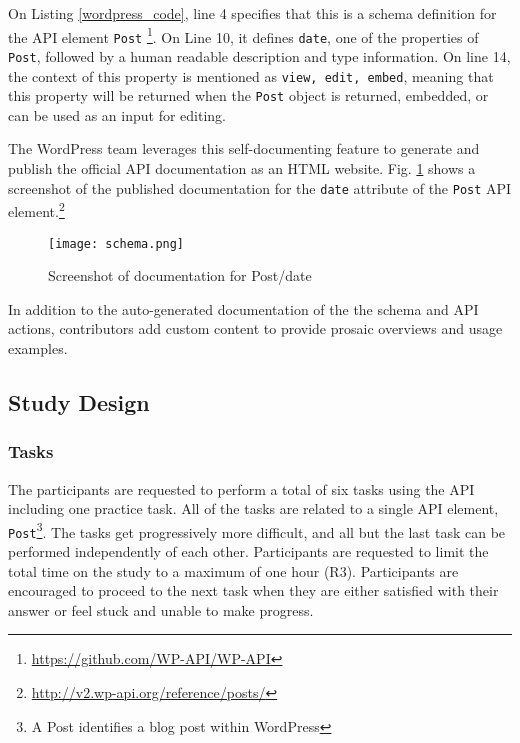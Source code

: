 On Listing \ref{wordpress_code}, line 4 specifies that this is a schema definition for the API element \lstinline{Post} \footnote{\url{https://github.com/WP-API/WP-API}}. On Line 10, it defines \lstinline{date}, one of the properties of \lstinline{Post}, followed by a human readable description and type information. On line 14, the context of this property is mentioned as \lstinline{view, edit, embed}, meaning that this property will be returned when the \lstinline{Post} object is returned, embedded, or can be used as an input for editing.

The WordPress team leverages this self-documenting feature to generate and publish the official API documentation as an HTML website. Fig. \ref{fig:schema} shows a screenshot of the published documentation for the \lstinline{date} attribute of the \lstinline{Post} API element.\footnote{\url{http://v2.wp-api.org/reference/posts/}}

\begin{figure}[h!]
  \begin{center}
    \texttt{[image: schema.png]}
  \end{center}
  \caption{Screenshot of documentation for Post/date}
  \label{fig:schema}
\end{figure}

In addition to the auto-generated documentation of the the schema and API actions, contributors add custom content to provide prosaic overviews and usage examples.



\subsection{Study Design} %
\subsubsection{Tasks} %

The participants are requested to perform a total of six tasks using the API including one practice task. All of the tasks are related to a single API element, \lstinline{Post}\footnote{A Post identifies a blog post within WordPress}. The tasks get progressively more difficult, and all but the last task can be performed independently of each other. Participants are requested to limit the total time on the study to a maximum of one hour (R3). Participants are encouraged to proceed to the next task when they are either satisfied with their answer or feel stuck and unable to make progress.

